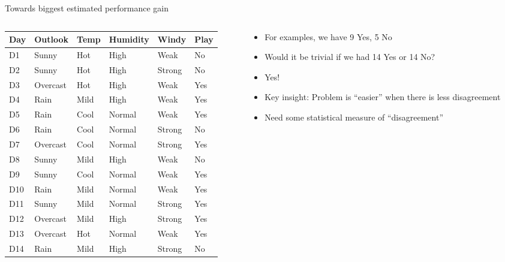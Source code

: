 \documentclass[usenames,dvipsnames]{beamer}
\begin{document}
\begin{frame}{Towards biggest estimated performance gain}
\begin{columns}
\begin{column}{.7\textwidth}


\begin{scriptsize}


	\begin{tabular}{lllll||l} \toprule
	\textbf{Day} & \textbf{Outlook}  & \textbf{Temp} & \textbf{Humidity} & \textbf{Windy}  & \textbf{Play} \\ \midrule
	D1  & Sunny    & Hot  & High     & Weak   & No   \\
	D2  & Sunny    & Hot  & High     & Strong & No   \\
	D3  & Overcast & Hot  & High     & Weak   & Yes  \\
	D4  & Rain     & Mild & High     & Weak   & Yes  \\
	D5  & Rain     & Cool & Normal   & Weak   & Yes  \\
	D6  & Rain     & Cool & Normal   & Strong & No   \\
	D7  & Overcast & Cool & Normal   & Strong & Yes  \\
	D8  & Sunny    & Mild & High     & Weak   & No   \\
	D9  & Sunny    & Cool & Normal   & Weak   & Yes  \\
	D10 & Rain     & Mild & Normal   & Weak   & Yes  \\
	D11 & Sunny    & Mild & Normal   & Strong & Yes  \\
	D12 & Overcast & Mild & High     & Strong & Yes  \\
	D13 & Overcast & Hot  & Normal   & Weak   & Yes  \\
	D14 & Rain     & Mild & High     & Strong & No  \\ \bottomrule
\end{tabular}
\end{scriptsize}
\end{column}
\begin{column}{0.4\textwidth}
	\begin{scriptsize}
\begin{itemize}
	\pause \item For examples, we have 9 Yes, 5 No
	\pause \item Would it be trivial if we had 14 Yes or 14 No?
	\pause \item Yes!
	\pause \item Key insight: Problem is ``easier'' when there is less disagreement
	\pause 	\item Need some statistical measure of ``disagreement'' 
	\end{itemize}

\end{scriptsize}
\end{column}

\end{columns}

\end{frame}
\end{document}
